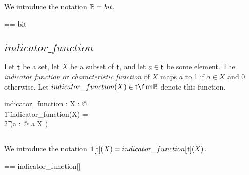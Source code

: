 \documentclass[11pt, oneside]{article}
\begin{document}
\subsection{}

We introduce the notation $\mathbb{B} = bit$.

\begin{zed}
	\B == bit
\end{zed}

\subsection{$indicator\_function$}

Let $\mathsf{t}$ be a set, 
let $X$ be a subset of $\mathsf{t}$, and 
let $a \in \mathsf{t}$ be some element.
The \textit{indicator function} or \textit{characteristic function} of $X$ maps $a$ to 1 if $a \in X$ and 0 otherwise.
Let $indicator\_function(X) \in \genT \fun \B$ denote this function.

\begin{gendef}[\genT]
	indicator\_function : \power \genT \fun \genT \fun \B
\where
	\forall X : \power \genT @ \\
		\t1 indicator\_function(X) = \\
			\t2 (\lambda a : \genT @ \IF a \in X  )
\end{gendef}

\subsection{}

We introduce the notation $\mathbf{1}[\mathsf{t}](X) = indicator\_function[\mathsf{t}](X)$.

\begin{zed}
	\indF[\genT] == indicator\_function[\genT]
\end{zed}

\printbibliography
\end{document}
